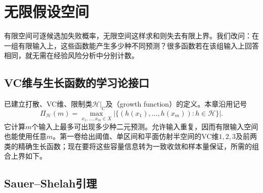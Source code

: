 \section{无限假设空间}
\label{sec:binary-infinite-class}

有限空间可逐候选加失败概率，无限空间这样求和则失去有限上界。我们改问：在一组有限输入上，这些函数能产生多少种不同预测？很多函数若在该组输入上回答相同，就无需在经验风险分析中分别计数。

\subsection{VC维与生长函数的学习论接口}
\label{sec:binary-shattering-vc}

已建立打散、VC维、限制类$\mathcal H|_C$及（growth function）的定义。本章沿用记号
\begin{equation}
 \Pi_{\mathcal H}(m)
 =\max_{x_1,\ldots,x_m\in X}
   \left|\{(h(x_1),\ldots,h(x_m)):h\in\mathcal H\}\right|.
 \label{eq:learning-growth-function}
\end{equation}
它计算$m$个输入上最多可出现多少种二元预测。允许输入重复，因而有限输入空间也能使用任意$m$。第一卷给出阈值、单区间和平面仿射半空间的VC维$1,2,3$及前两类的精确生长函数；现在要将这些容量信息转为一致收敛和样本量保证，所需的组合上界如下。

\subsection{Sauer--Shelah引理}
\label{sec:binary-growth-sauer}

